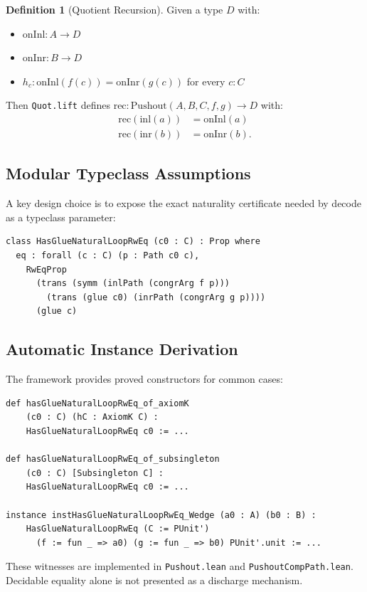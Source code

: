 \documentclass{lmcs}
\theoremstyle{definition}
\newtheorem{definition}{Definition}[section]
\theoremstyle{plain}
\theoremstyle{remark}
\newcommand{\Pushout}{\mathrm{Pushout}}
\newcommand{\inl}{\mathrm{inl}}
\newcommand{\inr}{\mathrm{inr}}
\begin{document}
\begin{definition}[Quotient Recursion]
\label{def:pushout-rec}
Given a type $D$ with:
\begin{itemize}
    \item $\mathrm{onInl} : A \to D$
    \item $\mathrm{onInr} : B \to D$
    \item $h_c : \mathrm{onInl}(f(c))=\mathrm{onInr}(g(c))$ for every \(c:C\)
\end{itemize}
Then \texttt{Quot.lift} defines
$\mathrm{rec} : \Pushout(A, B, C, f, g) \to D$ with:
\begin{align*}
\mathrm{rec}(\inl(a)) &= \mathrm{onInl}(a) \\
\mathrm{rec}(\inr(b)) &= \mathrm{onInr}(b).
\end{align*}
\end{definition}

\subsection{Modular Typeclass Assumptions}

A key design choice is to expose the exact naturality certificate needed by
decode as a typeclass parameter:

\begin{lstlisting}
class HasGlueNaturalLoopRwEq (c0 : C) : Prop where
  eq : forall (c : C) (p : Path c0 c),
    RwEqProp
      (trans (symm (inlPath (congrArg f p)))
        (trans (glue c0) (inrPath (congrArg g p))))
      (glue c)
\end{lstlisting}

\subsection{Automatic Instance Derivation}

The framework provides proved constructors for common cases:

\begin{lstlisting}
def hasGlueNaturalLoopRwEq_of_axiomK
    (c0 : C) (hC : AxiomK C) :
    HasGlueNaturalLoopRwEq c0 := ...

def hasGlueNaturalLoopRwEq_of_subsingleton
    (c0 : C) [Subsingleton C] :
    HasGlueNaturalLoopRwEq c0 := ...

instance instHasGlueNaturalLoopRwEq_Wedge (a0 : A) (b0 : B) :
    HasGlueNaturalLoopRwEq (C := PUnit')
      (f := fun _ => a0) (g := fun _ => b0) PUnit'.unit := ...
\end{lstlisting}
These witnesses are implemented in \texttt{Pushout.lean} and
\texttt{PushoutCompPath.lean}.  Decidable equality alone is not presented as a
discharge mechanism.
\end{document}
